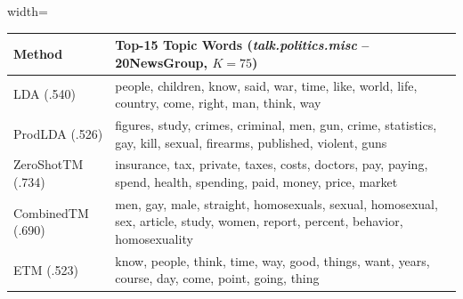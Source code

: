 \begin{table}[t]
\begin{adjustbox}{width=\linewidth}
\begin{tabular}{@{}l l@{}}
    \midrule
    \textbf{Method} & \textbf{Top-15 Topic Words (\textit{talk.politics.misc} -- 20NewsGroup, $K=75$)} \\
    \midrule
    {\tiny LDA (.540)} & \textcolor{green!90!black}{people}, \textcolor{green!90!black}{children}, \textcolor{black!70}{know}, \textcolor{green!60!black}{said}, \textcolor{green!40!black}{war}, \textcolor{black!40}{time}, \textcolor{black!40}{like}, \textcolor{black!70}{world}, \textcolor{green!90!black}{life}, \textcolor{green!40!black}{country}, \textcolor{green!60!black}{come}, \textcolor{black!70}{right}, \textcolor{green!40!black}{man}, \textcolor{green!60!black}{think}, \textcolor{black!40}{way} \\
    {\tiny ProdLDA (.526)} & \textcolor{green!40!black}{figures}, \textcolor{green!40!black}{study}, \textcolor{green!60!black}{crimes}, \textcolor{green!90!black}{criminal}, \textcolor{black!70}{men}, \textcolor{green!90!black}{gun}, \textcolor{green!60!black}{crime}, \textcolor{black!70}{statistics}, \textcolor{black!40}{gay}, \textcolor{black!70}{kill}, \textcolor{black!40}{sexual}, \textcolor{green!40!black}{firearms}, \textcolor{black!40}{published}, \textcolor{green!90!black}{violent}, \textcolor{green!60!black}{guns} \\
    {\tiny ZeroShotTM (.734)} & \textcolor{green!60!black}{insurance}, \textcolor{green!40!black}{tax}, \textcolor{black!40}{private}, \textcolor{green!90!black}{taxes}, \textcolor{green!40!black}{costs}, \textcolor{black!40}{doctors}, \textcolor{green!90!black}{pay}, \textcolor{green!60!black}{paying}, \textcolor{black!70}{spend}, \textcolor{green!40!black}{health}, \textcolor{black!70}{spending}, \textcolor{green!60!black}{paid}, \textcolor{green!90!black}{money}, \textcolor{black!40}{price}, \textcolor{black!70}{market} \\
    {\tiny CombinedTM (.690)} & \textcolor{green!40!black}{men}, \textcolor{green!90!black}{gay}, \textcolor{green!60!black}{male}, \textcolor{black!40}{straight}, \textcolor{green!60!black}{homosexuals}, \textcolor{green!90!black}{sexual}, \textcolor{green!40!black}{homosexual}, \textcolor{green!90!black}{sex}, \textcolor{black!40}{article}, \textcolor{black!70}{study}, \textcolor{black!70}{women}, \textcolor{black!40}{report}, \textcolor{black!70}{percent}, \textcolor{green!40!black}{behavior}, \textcolor{green!60!black}{homosexuality} \\
    {\tiny ETM (.523)} & \textcolor{green!60!black}{know}, \textcolor{green!60!black}{people}, \textcolor{green!90!black}{think}, \textcolor{black!40}{time}, \textcolor{green!40!black}{way}, \textcolor{black!70}{good}, \textcolor{green!90!black}{things}, \textcolor{black!70}{want}, \textcolor{black!40}{years}, \textcolor{green!40!black}{course}, \textcolor{black!40}{day}, \textcolor{green!40!black}{come}, \textcolor{black!70}{point}, \textcolor{green!90!black}{going}, \textcolor{green!60!black}{thing} \\

\end{tabular}
\end{adjustbox}
\end{table}
